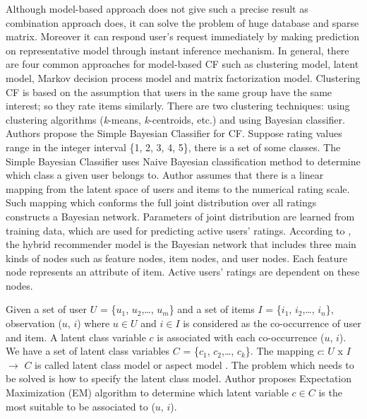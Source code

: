 \documentclass[10pt]{article}
\begin{document}
Although model-based approach does not give such a precise result as combination approach does, it can solve the problem of huge database and sparse matrix. Moreover it can respond user's request immediately by making prediction on representative model through instant inference mechanism. In general, there are four common approaches for model-based CF such as clustering model, latent model, Markov decision process model and matrix factorization model. Clustering CF \cite{ungar:clusteringcf} is based on the assumption that users in the same group have the same interest; so they rate items similarly. There are two clustering techniques: using clustering algorithms (\textit{k}-means, \textit{k}-centroids, etc.) and using Bayesian classifier. Authors \cite{miyahara:simplebayes} propose the Simple Bayesian Classifier for CF. Suppose rating values range in the integer interval \{1, 2, 3, 4, 5\}, there is a set of some classes. The Simple Bayesian Classifier uses Naive Bayesian classification method \cite[p.~4]{miyahara:simplebayes} to determine which class a given user belongs to. Author \cite{langseth:bayescf} assumes that there is a linear mapping from the latent space of users and items to the numerical rating scale. Such mapping which conforms the full joint distribution over all ratings constructs a Bayesian network. Parameters of joint distribution are learned from training data, which are used for predicting active users' ratings. According to \cite{campos:hybridbayes}, the hybrid recommender model is the Bayesian network that includes three main kinds of nodes such as feature nodes, item nodes, and user nodes. Each feature node represents an attribute of item. Active users' ratings are dependent on these nodes.

Given a set of user $U$ = \{$u_1$, $u_2$,\ldots, $u_m$\} and a set of items $I$ = \{$i_1$, $i_2$,\ldots, $i_n$\}, observation ($u$, $i$) where $u \in U$ and $i \in I$ is considered as the co-occurrence of user and item. A latent class variable $c$ is associated with each co-occurrence ($u$, $i$). We have a set of latent class variables $C$ = \{$c_1$, $c_2$,\ldots, $c_k$\}. The mapping $c$: $U$ x $I$ $\rightarrow$ $C$ is called latent class model or aspect model \cite[pp.~91-92]{thomas:latentcf}. The problem which needs to be solved is how to specify the latent class model. Author \cite[p.~95]{thomas:latentcf} proposes Expectation Maximization (EM) algorithm to determine which latent variable $c \in C$ is the most suitable to be associated to ($u$, $i$).
\end{document}
